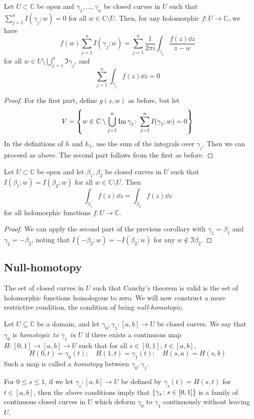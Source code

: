 \begin{corollary}
	Let \( U \subset \mathbb C \) be open and \( \gamma_1, \dots, \gamma_n \) be closed curves in \( U \) such that \( \sum_{j=1}^n I(\gamma_j;w) = 0 \) for all \( w \in \mathbb C \setminus U \).
	Then, for any holomorphic \( f \colon U \to \mathbb C \), we have
	\[ f(w) \sum_{j=1}^n I(\gamma_j;w) = \sum_{j=1}^n \frac{1}{2\pi i} \int_{\gamma_j} \frac{f(z) \dd{z}}{z-w} \]
	for all \( w \in U \setminus \bigcup_{j=1}^n \Im \gamma_j \), and
	\[ \sum_{j=1}^n \int_{\gamma_j} f(z) \dd{z} = 0 \]
\end{corollary}
\begin{proof}
	For the first part, define \( g(z,w) \) as before, but let
	\[ V = \qty{w \in \mathbb C \setminus \bigcup_{j=1}^n \Im \gamma_j \colon \sum_{j=1}^n I(\gamma_j;w) = 0} \]
	In the definitions of \( h \) and \( h_1 \), use the sum of the integrals over \( \gamma_j \).
	Then we can proceed as above.
	The second part follows from the first as before.
\end{proof}
\begin{corollary}
	Let \( U \subset \mathbb C \) be open and let \( \beta_1, \beta_2 \) be closed curves in \( U \) such that \( I(\beta_1;w) = I(\beta_2;w) \) for all \( w \in \mathbb C \setminus U \).
	Then
	\[ \int_{\beta_1} f(z) \dd{z} = \int_{\beta_2} f(z) \dd{z} \]
	for all holomorphic functions \( f \colon U \to \mathbb C \).
\end{corollary}
\begin{proof}
	We can apply the second part of the previous corollary with \( \gamma_1 = \beta_1 \) and \( \gamma_2 = -\beta_2 \), noting that \( I(-\beta_2;w) = -I(\beta_2;w) \) for any \( w \not\in \Im \beta_2 \).
\end{proof}

\subsection{Null-homotopy}
The set of closed curves in \( U \) such that Cauchy's theorem is valid is the set of holomorphic functions homologous to zero.
We will now construct a more restrictive condition, the condition of being \textit{null-homotopic}.
\begin{definition}
	Let \( U \subseteq \mathbb C \) be a domain, and let \( \gamma_0, \gamma_1 \colon [a,b] \to U \) be closed curves.
	We say that \( \gamma_0 \) is \textit{homotopic to \( \gamma_1 \) in \( U \)} if there exists a continuous map \( H \colon [0,1] \to [a,b] \to U \) such that for all \( s \in [0,1] \), \( t \in [a,b] \),
	\[ H(0,t) = \gamma_0(t);\quad H(1,t) = \gamma_1(t);\quad H(s,a) = H(s,b) \]
	Such a map is called a \textit{homotopy} between \( \gamma_0, \gamma_1 \).
\end{definition}
For \( 0 \leq s \leq 1 \), if we let \( \gamma_s\colon [a,b] \to U \) be defined by \( \gamma_s(t) = H(s,t) \) for \( t \in [a,b] \), then the above conditions imply that \( \qty{\gamma_s \colon s \in [0,1]} \) is a family of continuous closed curves in \( U \) which deform \( \gamma_0 \) to \( \gamma_1 \) continuously without leaving \( U \).
